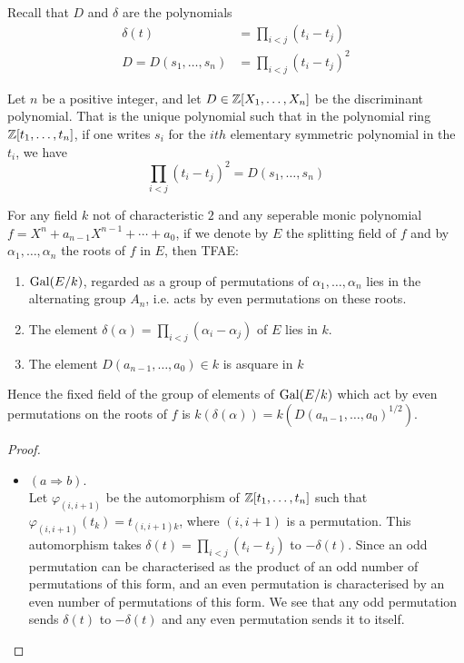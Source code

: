 	\begin{bergman}
    Recall that $D$ and $\delta$ are the polynomials 
		\begin{align*}
			\delta(t) &= \prod_{i<j}(t_i-t_j)\\
			D = D(s_1,\ldots,s_n)&= \prod_{i<j}{(t_i-t_j)}^2
		\end{align*}
    \begin{lemma}
      Let $n$ be a positive integer, and let $D\in \mathbb{Z}[X_1,\ldots,X_n]$ be the discriminant polynomial. That is the unique polynomial such that in the polynomial ring $\mathbb{Z}[t_1,\ldots,t_n]$, if one writes $s_i$ for the $ith$ elementary symmetric polynomial in the $t_i$, we have \[
          \prod_{i<j} {(t_i-t_j)}^2 = D(s_1,\ldots,s_n)  
      \]

      For any field $k$ not of characteristic $2$ and any seperable monic polynomial $f = X^n + a_{n-1}X^{n-1}+\cdots + a_0$, if we denote by $E$ the splitting field of $f$ and by $\alpha_1,\ldots,\alpha_n$ the roots of $f$ in $E$, then TFAE:\begin{enumerate}[label = (\alph*)]
        \item $\text{Gal}(E/k)$, regarded as a group of permutations of $\alpha_1,\ldots,\alpha_n$ lies in the alternating group $A_n$, i.e. acts by even permutations on these roots.
        \item The element $\delta(\alpha) = \prod_{i<j}(\alpha_i-\alpha_j)$ of $E$ lies in $k$.
        \item The element $D(a_{n-1},\ldots,a_0)\in k$ is  asquare in $k$
      \end{enumerate}
      Hence the fixed field of the group of elements of $\text{Gal}(E/k)$ which act by even permutations on the roots of $f$ is $k(\delta(\alpha)) = k({D(a_{n-1},\ldots,a_0)}^{1/2})$.
    \end{lemma}
    \begin{proof}
      \begin{itemize}
        \item $(a\Rightarrow b)$. \\ Let $\varphi_{(i,i+1)}$ be the automorphism of $\mathbb{Z}[t_1,\ldots,t_n]$ such that $\varphi_{(i,i+1)}(t_k) = t_{(i,i+1)k}$, where $(i,i+1)$ is a permutation. This automorphism takes $\delta(t) = \prod_{i<j}(t_i-t_j)$ to $-\delta(t)$. Since an odd permutation can be characterised as the product of an odd number of permutations of this form, and an even permutation is characterised by an even number of permutations of this form.
        We see that any odd permutation sends $\delta(t)$ to $-\delta(t)$ and any even permutation sends it to itself.
  

\end{itemize}
\end{proof}
\end{bergman}
